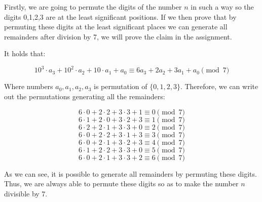 \documentclass{fkssolpub}
\author{Ondřej Sedláček}
\begin{document}
Firstly, we are going to permute the digits of the number $n$ in such a way so the digits 0,1,2,3 are at the least significant positions. If we then prove that by permuting these digits at the least significant places we can generate all remainders after division by 7, we will prove the claim in the assignment.

It holds that:

\[
  10^3 \cdot a_3 + 10^2 \cdot a_2 + 10 \cdot a_1 + a_0 \equiv 6a_3 + 2a_2 + 3a_1 + a_0 \pmod{7}
\]

Where numbers $a_0, a_1, a_2, a_3$ is permutation of $\{0,1,2,3\}$. Therefore, we can write out the permutations generating all the remainders:

\[
 6 \cdot 0 + 2 \cdot 2 + 3 \cdot 3 + 1 \equiv 0 \pmod{7}
\]
\[
 6 \cdot 1 + 2 \cdot 0 + 3 \cdot 2 + 3 \equiv 1 \pmod{7}
\]
\[
 6 \cdot 2 + 2 \cdot 1 + 3 \cdot 3 + 0 \equiv 2 \pmod{7}
\]
\[
 6 \cdot 0 + 2 \cdot 2 + 3 \cdot 1 + 3 \equiv 3 \pmod{7}
\]
\[
 6 \cdot 0 + 2 \cdot 1 + 3 \cdot 2 + 3 \equiv 4 \pmod{7}
\]
\[
 6 \cdot 1 + 2 \cdot 2 + 3 \cdot 3 + 0 \equiv 5 \pmod{7}
\]
\[
 6 \cdot 0 + 2 \cdot 1 + 3 \cdot 3 + 2 \equiv 6 \pmod{7}
\]

As we can see, it is possible to generate all remainders by permuting these digits. Thus, we are always able to permute these digits so as to make the number $n$ divisible by 7.
\end{document}
